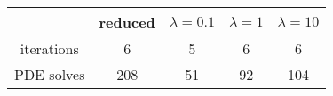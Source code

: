 \begin{tabular}{ccccc}
& reduced & $\lambda = 0.1$ & $\lambda = 1$ & $\lambda = 10$ \\
\hline
iterations & 6 & 5 & 6 & 6 \\
PDE solves & 208 & 51 & 92 & 104 \\
\hline
\end{tabular}
